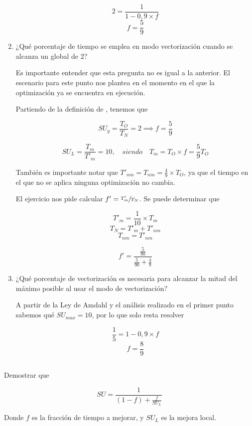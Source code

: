 \begin{enumerate}
 $$ 2 = \frac{1}{1 - 0,9 \times f}$$
 $$ f  = \frac{5}{9} $$
 
 \threeemdash
 \item ¿Qué porcentaje de tiempo se emplea en modo vectorización cuando se alcanza un \SU global de 2?

 Es importante entender que esta pregunta no es igual a la anterior. El escenario para este punto nos plantea en el momento en el que 
 la optimización ya se encuentra en ejecución.

 Partiendo de la definición de \SU, tenemos que 

 $$ SU_g = \frac{T_O}{T_N} = 2 \implies f = \frac{5}{9} $$

 $$ SU_L = \frac{T_m}{T'_m} = 10,\quad siendo \quad T_m = T_O \times f = \frac{5}{9}T_O $$

 También es importante notar que $ T'_{nm} = T_{nm} = \frac{4}{9} \times T_O $, ya que el tiempo 
 en el que no se aplica ninguna optimización no cambia.
 
 El ejercicio nos pide calcular $ f' = \sfrac{T'_m}{T_N} $. Se puede determinar que
 
 $$ T'_m =  \frac{1}{10} \times T_m $$ 
 $$ T_N = T'_{m} + T'_{nm} $$
 $$ T_{nm} = T'_{nm} $$ 
 
 $$ f' = \frac{\frac{5}{90}}{\frac{5}{90} + \frac{4}{9}} $$
 
 \threeemdash
 \item ¿Qué porcentaje de vectorización es necesaria para alcanzar la mitad del máximo \SU posible al usar el modo de vectorización?

 A partir de la Ley de Amdahl y el análisis realizado en el primer punto sabemos qué $SU_{max} = 10$, por lo que solo resta resolver

 $$ \frac{1}{5} = 1 - 0,9 \times f $$
 $$ f = \frac{8}{9} $$ 
 
 \threeemdash

\end{enumerate}


\subsection{}
Demostrar que 

						 $$ SU = \frac {1} {(1-f) + \frac {f}{SU_L}} $$


Donde $f$ es la fracción de tiempo a mejorar, y $SU_L$ es la mejora local.

\subsection{}

